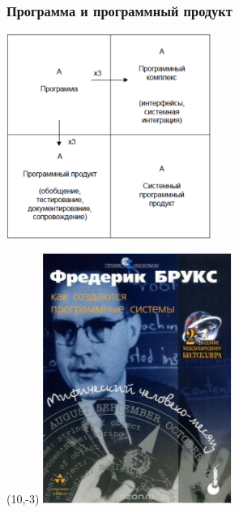 \documentclass[xetex,mathserif,serif]{beamer}
\begin{document}
	\begin{frame}
		\frametitle{Программа и программный продукт}
		\begin{center}
			\includegraphics[width=0.5\textwidth]{brooksSquare.png}
		\end{center}
		\begin{textblock}{2}(10,-3)
			\includegraphics[width=\textwidth]{brooksCover.png}
		\end{textblock}
	\end{frame}
\end{document}
